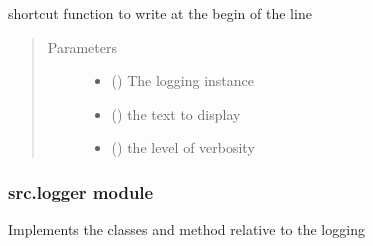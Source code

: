 \documentclass[a4paper,10pt,english]{sphinxmanual}
\begin{document}
\begin{fulllineitems}
\label{\detokenize{commands/apidoc/src:src.fork.write_back}}
shortcut function to write at the begin of the line
\begin{quote}\begin{description}
\item[{Parameters}] \leavevmode\begin{itemize}
\item {} 
 () \textendash{} The logging instance

\item {} 
 () \textendash{} the text to display

\item {} 
 () \textendash{} the level of verbosity

\end{itemize}

\end{description}\end{quote}

\end{fulllineitems}



\subsubsection{src.logger module}
\label{\detokenize{commands/apidoc/src:module-src.logger}}\label{\detokenize{commands/apidoc/src:src-logger-module}}
Implements the classes and method relative to the logging
\end{document}
